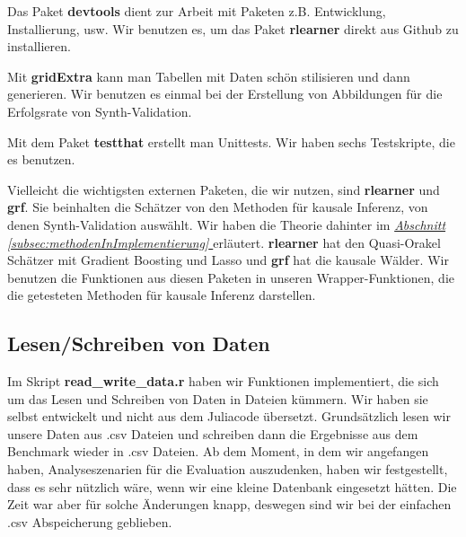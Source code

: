 \documentclass[12pt,a4paper,twoside]{scrartcl}
\numberwithin{equation}{section}
\newcommand{\refsec}[1]{\emph{\hyperref[#1]{Abschnitt \ref*{#1} }}}
\begin{document}
\noindent
Das Paket \textbf{devtools} dient zur Arbeit mit Paketen z.B. Entwicklung, Installierung, usw. Wir benutzen es, um das Paket \textbf{rlearner} direkt aus Github zu installieren.\par

\noindent
Mit \textbf{gridExtra} kann man Tabellen mit Daten schön stilisieren und dann generieren. Wir benutzen es einmal bei der Erstellung von Abbildungen für die Erfolgsrate von Synth-Validation.\par

\noindent
Mit dem Paket \textbf{testthat} erstellt man Unittests. Wir haben sechs Testskripte, die es benutzen.\par

\noindent
Vielleicht die wichtigsten externen Paketen, die wir nutzen, sind \textbf{rlearner} und \textbf{grf}. Sie beinhalten die Schätzer von den Methoden für kausale Inferenz, von denen Synth-Validation auswählt. Wir haben die Theorie dahinter im \refsec{subsec:methodenInImplementierung} erläutert. \textbf{rlearner} hat den Quasi-Orakel Schätzer mit Gradient Boosting und Lasso und  \textbf{grf} hat die kausale Wälder. Wir benutzen die Funktionen aus diesen Paketen in unseren Wrapper-Funktionen, die die getesteten Methoden für kausale Inferenz darstellen.\par
\subsection{Lesen/Schreiben von Daten}\label{subsec:lesenSchreibenDaten}

Im Skript \textbf{read\_write\_data.r} haben wir Funktionen implementiert, die sich um das Lesen und Schreiben von Daten in Dateien kümmern. Wir haben sie selbst entwickelt und nicht aus dem Juliacode übersetzt. Grundsätzlich lesen wir unsere Daten aus .csv Dateien und schreiben dann die Ergebnisse aus dem Benchmark wieder in .csv Dateien. Ab dem Moment, in dem wir angefangen haben, Analyseszenarien für die Evaluation auszudenken, haben wir festgestellt, dass es sehr nützlich wäre, wenn wir eine kleine Datenbank eingesetzt hätten. Die Zeit war aber für solche Änderungen knapp, deswegen sind wir bei der einfachen .csv Abspeicherung geblieben.\par 
\end{document}
